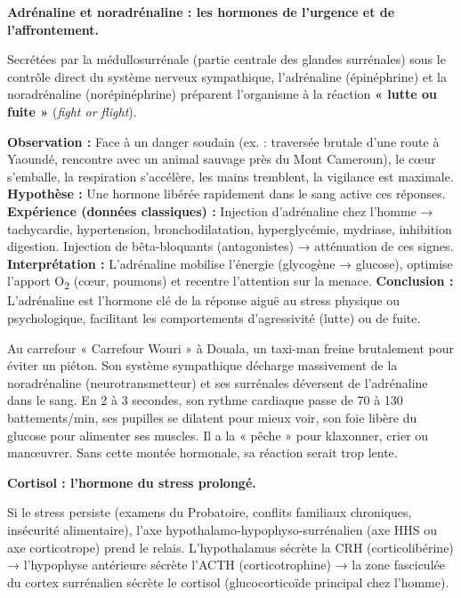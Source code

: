 \documentclass[11pt]{article}
\newcommand{\cle}[1]{{\popxbold\color{popdark}#1}}
\begin{document}
\textbf{Adrénaline et noradrénaline : les hormones de l'urgence et de l'affrontement.}\par

Secrétées par la \cle{médullosurrénale} (partie centrale des glandes surrénales) sous le contrôle direct du système nerveux \cle{sympathique}, l'\cle{adrénaline} (épinéphrine) et la \cle{noradrénaline} (norépinéphrine) préparent l'organisme à la réaction \textbf{« lutte ou fuite »} (\emph{fight or flight}).

\begin{experience}
\textbf{Observation :} Face à un danger soudain (ex. : traversée brutale d'une route à Yaoundé, rencontre avec un animal sauvage près du Mont Cameroun), le cœur s'emballe, la respiration s'accélère, les mains tremblent, la vigilance est maximale.
\textbf{Hypothèse :} Une hormone libérée rapidement dans le sang active ces réponses.
\textbf{Expérience (données classiques) :} Injection d'adrénaline chez l'homme → tachycardie, hypertension, bronchodilatation, hyperglycémie, mydriase, inhibition digestion. Injection de bêta-bloquants (antagonistes) → atténuation de ces signes.
\textbf{Interprétation :} L'adrénaline mobilise l'énergie (glycogène → glucose), optimise l'apport O\textsubscript{2} (cœur, poumons) et recentre l'attention sur la menace.
\textbf{Conclusion :} L'adrénaline est l'hormone clé de la réponse aiguë au stress physique ou psychologique, facilitant les comportements d'agressivité (lutte) ou de fuite.
\end{experience}

\begin{exemplebox}
Au carrefour « Carrefour Wouri » à Douala, un taxi-man freine brutalement pour éviter un piéton. Son système sympathique décharge massivement de la noradrénaline (neurotransmetteur) et ses surrénales déversent de l'adrénaline dans le sang. En 2 à 3 secondes, son rythme cardiaque passe de 70 à 130 battements/min, ses pupilles se dilatent pour mieux voir, son foie libère du glucose pour alimenter ses muscles. Il a la « pêche » pour klaxonner, crier ou manœuvrer. Sans cette montée hormonale, sa réaction serait trop lente.
\end{exemplebox}

\textbf{Cortisol : l'hormone du stress prolongé.}\par

Si le stress persiste (examens du Probatoire, conflits familiaux chroniques, insécurité alimentaire), l'axe \cle{hypothalamo-hypophyso-surrénalien} (axe HHS ou axe corticotrope) prend le relais. L'hypothalamus sécrète la \cle{CRH} (corticolibérine) → l'hypophyse antérieure sécrète l'\cle{ACTH} (corticotrophine) → la \cle{zone fasciculée} du cortex surrénalien sécrète le \cle{cortisol} (glucocorticoïde principal chez l'homme).
\end{document}
